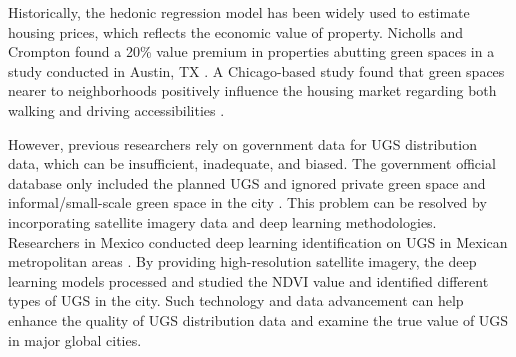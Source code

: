 \documentclass{article}
\begin{document}
Historically, the hedonic regression model has been widely used to estimate housing prices, which reflects the economic value of property. Nicholls and Crompton found a 20\% value premium in properties abutting green spaces in a study conducted in Austin, TX \cite{nicholls_impact_2005}. A Chicago-based study found that green spaces nearer to neighborhoods positively influence the housing market regarding both walking and driving accessibilities \cite{chen_spatial_2022}.

However, previous researchers rely on government data for UGS distribution data, which can be insufficient, inadequate, and biased. The government official database only included the planned UGS and ignored private green space and informal/small-scale green space in the city \cite{feltynowski_challenges_2018}. This problem can be resolved by incorporating satellite imagery data and deep learning methodologies. Researchers in Mexico conducted deep learning identification on UGS in Mexican metropolitan areas \cite{huerta2021}. By providing high-resolution satellite imagery, the deep learning models processed and studied the NDVI value and identified different types of UGS in the city. Such technology and data advancement can help enhance the quality of UGS distribution data and examine the true value of UGS in major global cities.



\end{document}
